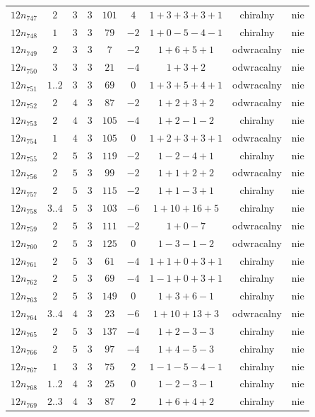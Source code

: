 \begin{longtable}{ccccccccc}
$12n_{747}$ & $2$ & $3$ & $3$ & $101$ & $4$ & $1+3+3+3+1$ & chiralny & nie \\
$12n_{748}$ & $1$ & $3$ & $3$ & $79$ & $-2$ & $1+0-5-4-1$ & chiralny & nie \\
$12n_{749}$ & $2$ & $3$ & $3$ & $7$ & $-2$ & $1+6+5+1$ & odwracalny & nie \\
$12n_{750}$ & $3$ & $3$ & $3$ & $21$ & $-4$ & $1+3+2$ & odwracalny & nie \\
$12n_{751}$ & $1..2$ & $3$ & $3$ & $69$ & $0$ & $1+3+5+4+1$ & odwracalny & nie \\
$12n_{752}$ & $2$ & $4$ & $3$ & $87$ & $-2$ & $1+2+3+2$ & odwracalny & nie \\
$12n_{753}$ & $2$ & $4$ & $3$ & $105$ & $-4$ & $1+2-1-2$ & chiralny & nie \\
$12n_{754}$ & $1$ & $4$ & $3$ & $105$ & $0$ & $1+2+3+3+1$ & odwracalny & nie \\
$12n_{755}$ & $2$ & $5$ & $3$ & $119$ & $-2$ & $1-2-4+1$ & chiralny & nie \\
$12n_{756}$ & $2$ & $5$ & $3$ & $99$ & $-2$ & $1+1+2+2$ & odwracalny & nie \\
$12n_{757}$ & $2$ & $5$ & $3$ & $115$ & $-2$ & $1+1-3+1$ & chiralny & nie \\
$12n_{758}$ & $3..4$ & $5$ & $3$ & $103$ & $-6$ & $1+10+16+5$ & chiralny & nie \\
$12n_{759}$ & $2$ & $5$ & $3$ & $111$ & $-2$ & $1+0-7$ & odwracalny & nie \\
$12n_{760}$ & $2$ & $5$ & $3$ & $125$ & $0$ & $1-3-1-2$ & odwracalny & nie \\
$12n_{761}$ & $2$ & $5$ & $3$ & $61$ & $-4$ & $1+1+0+3+1$ & chiralny & nie \\
$12n_{762}$ & $2$ & $5$ & $3$ & $69$ & $-4$ & $1-1+0+3+1$ & chiralny & nie \\
$12n_{763}$ & $2$ & $5$ & $3$ & $149$ & $0$ & $1+3+6-1$ & chiralny & nie \\
$12n_{764}$ & $3..4$ & $4$ & $3$ & $23$ & $-6$ & $1+10+13+3$ & odwracalny & nie \\
$12n_{765}$ & $2$ & $5$ & $3$ & $137$ & $-4$ & $1+2-3-3$ & chiralny & nie \\
$12n_{766}$ & $2$ & $5$ & $3$ & $97$ & $-4$ & $1+4-5-3$ & chiralny & nie \\
$12n_{767}$ & $1$ & $3$ & $3$ & $75$ & $2$ & $1-1-5-4-1$ & chiralny & nie \\
$12n_{768}$ & $1..2$ & $4$ & $3$ & $25$ & $0$ & $1-2-3-1$ & chiralny & nie \\
$12n_{769}$ & $2..3$ & $4$ & $3$ & $87$ & $2$ & $1+6+4+2$ & chiralny & nie \\

\end{longtable}
